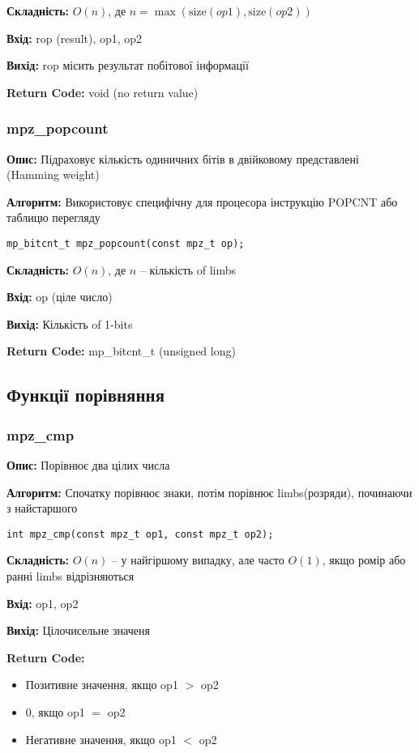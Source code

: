 \textbf{Складність:} $O(n)$, де $n = \max(\text{size}(op1), \text{size}(op2))$

\textbf{Вхід:} rop (result), op1, op2

\textbf{Вихід:} rop місить результат побітової інформації

\textbf{Return Code:} void (no return value)

\subsubsection{mpz\_popcount}
\textbf{Опис:} Підраховує кількість одиничних бітів в двійковому представлені (Hamming weight)

\textbf{Алгоритм:} Використовує специфічну для процесора інструкцію POPCNT або таблицю перегляду

\begin{verbatim}
mp_bitcnt_t mpz_popcount(const mpz_t op);
\end{verbatim}

\textbf{Складність:} $O(n)$, де $n$ -- кількість of limbs

\textbf{Вхід:} op (ціле число)

\textbf{Вихід:} Кількість of 1-bits

\textbf{Return Code:} mp\_bitcnt\_t (unsigned long)

\subsection{Функції порівняння}

\subsubsection{mpz\_cmp}
\textbf{Опис:} Порівнює два цілих числа

\textbf{Алгоритм:} Спочатку порівнює знаки, потім порівнює limbs(розряди), починаючи з найстаршого

\begin{verbatim}
int mpz_cmp(const mpz_t op1, const mpz_t op2);
\end{verbatim}

\textbf{Складність:} $O(n)$ -- у найгіршому випадку, але часто $O(1)$, якщо ромір або ранні limbs відрізняються

\textbf{Вхід:} op1, op2

\textbf{Вихід:} Цілочисельне значеня

\textbf{Return Code:}
\begin{itemize}
    \item Позитивне значення, якщо op1 $>$ op2
    \item 0, якщо op1 $=$ op2
    \item Негативне значення, якщо op1 $<$ op2
\end{itemize}

